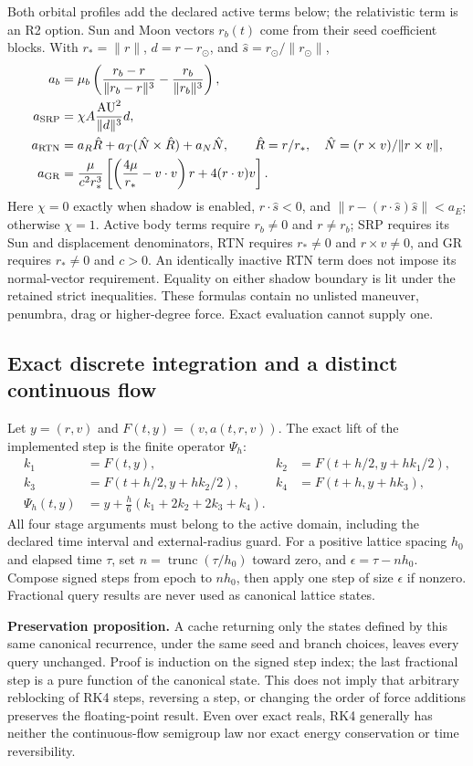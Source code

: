 Both orbital profiles add the declared active terms below; the relativistic
term is an R2 option. Sun and Moon vectors $r_b(t)$ come from their seed
coefficient blocks. With $r_*=\|r\|$, $d=r-r_\odot$, and $\hat s=r_\odot/\|r_\odot\|$,
\begin{align}
 a_b&=\mu_b\left(\frac{r_b-r}{\|r_b-r\|^3}-\frac{r_b}{\|r_b\|^3}\right),\\
 a_{\rm SRP}&=\chi A\frac{\mathrm{AU}^2}{\|d\|^3}d,\\
 a_{\rm RTN}&=a_R\hat R+a_T(\hat N\times\hat R)+a_N\hat N,
 \qquad \hat R=r/r_*,\quad \hat N=(r\times v)/\|r\times v\|,\\
 a_{\rm GR}&=\frac{\mu}{c^2r_*^3}
 \left[\left(\frac{4\mu}{r_*}-v\cdot v\right)r+4(r\cdot v)v\right].
\end{align}
Here $\chi=0$ exactly when shadow is enabled, $r\cdot\hat s<0$, and
$\|r-(r\cdot\hat s)\hat s\|<a_E$; otherwise $\chi=1$.
Active body terms require $r_b\ne0$ and $r\ne r_b$; SRP requires its Sun and
displacement denominators, RTN requires $r_*\ne0$ and $r\times v\ne0$, and GR
requires $r_*\ne0$ and $c>0$. An identically inactive RTN term does not impose
its normal-vector requirement. Equality on either shadow boundary is lit under
the retained strict inequalities. These formulas contain no unlisted maneuver,
penumbra, drag or higher-degree force. Exact evaluation cannot supply one.

\subsection{Exact discrete integration and a distinct continuous flow}
\label{sec:lift-flow}
Let $y=(r,v)$ and $F(t,y)=(v,a(t,r,v))$. The exact lift of the implemented step
is the finite operator $\Psi_h$:
\begin{align}
 k_1&=F(t,y),& k_2&=F(t+h/2,y+hk_1/2),\\
 k_3&=F(t+h/2,y+hk_2/2),& k_4&=F(t+h,y+hk_3),\\
 \Psi_h(t,y)&=y+\tfrac h6(k_1+2k_2+2k_3+k_4).
\end{align}
All four stage arguments must belong to the active domain, including the
declared time interval and external-radius guard. For a positive lattice spacing
$h_0$ and elapsed time $\tau$, set $n=\operatorname{trunc}(\tau/h_0)$ toward zero,
and $\epsilon=\tau-nh_0$. Compose signed steps from epoch to $nh_0$, then apply
one step of size $\epsilon$ if nonzero. Fractional query results are never used
as canonical lattice states.

\textbf{Preservation proposition.} A cache returning only the states defined by
this same canonical recurrence, under the same seed and branch choices, leaves
every query unchanged. Proof is induction on the signed step index; the last
fractional step is a pure function of the canonical state. This does not imply
that arbitrary reblocking of RK4 steps, reversing a step, or changing the order
of force additions preserves the floating-point result. Even over exact reals,
RK4 generally has neither the continuous-flow semigroup law nor exact energy
conservation or time reversibility.

